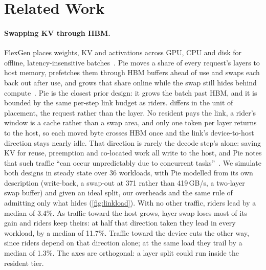 
\section{Related Work}\label{sec:related}

\paragraph{Swapping KV through HBM.} FlexGen places weights, KV and
activations across GPU, CPU and disk for offline, latency-insensitive
batches~\cite{flexgen}. Pie moves a share of every request's layers to host
memory, prefetches them through HBM buffers ahead of use and swaps each back
out after use, and grows that share online while the swap still hides behind
compute~\cite{pie}. Pie is the closest prior design: it grows the batch past
HBM, and it is bounded by the same per-step link budget as riders.
\sysname{} differs in the unit of placement, the request rather than the
layer. No resident pays the link, a rider's window is a cache rather than a
swap area, and only one token per layer returns to the host, so each moved
byte crosses HBM once and the link's device-to-host direction stays nearly
idle. That direction is rarely the decode step's alone: saving KV for reuse,
preemption and co-located work all write to the host, and Pie notes that such
traffic ``can occur unpredictably due to concurrent tasks''~\cite{pie}. We
simulate both designs in steady state over 36 workloads, with Pie modelled
from its own description (write-back, a swap-out at 371 rather than
419\,GB/s, a two-layer swap buffer) and given an ideal split, our overheads
and the same rule of admitting only what hides (\cref{fig:linkload}). With no
other traffic, riders lead by a median of 3.4\%. As traffic toward the host
grows, layer swap loses most of its gain and riders keep theirs: at half that
direction taken they lead in every workload, by a median of 11.7\%. Traffic
toward the device cuts the other way, since riders depend on that direction
alone; at the same load they trail by a median of 1.3\%. The axes are
orthogonal: a layer split could run inside the resident tier.

